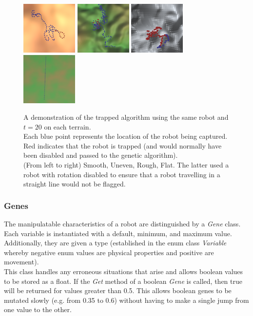 \documentclass{article}
\begin{document}
\begin{figure}[H]
\centering
\centerline{
\includegraphics[width=0.25\textwidth]{trappedSmooth}
\includegraphics[width=0.25\textwidth]{trappedUneven}
\includegraphics[width=0.25\textwidth]{trappedRough}
\includegraphics[width=0.25\textwidth]{trappedFlat}
}
\caption{A demonstration of the trapped algorithm using the same robot and $t=20$ on each terrain.\\
Each blue point represents the location of the robot being captured. Red indicates that the robot is trapped (and would normally have been disabled and passed to the genetic algorithm).\\ 
(From left to right) Smooth, Uneven, Rough, Flat. The latter used a robot with rotation disabled to ensure that a robot travelling in a straight line would not be flagged.}
\label{fig:trappedPoints}
\end{figure}


\subsubsection{Genes}
\label{sec:Genes Imp}
The manipulatable characteristics of a robot are distinguished by a \textit{Gene} class. Each variable is instantiated with a default, minimum, and maximum value. Additionally, they are given a type (established in the enum class \textit{Variable} whereby negative enum values are physical properties and positive are movement). \\
This class handles any erroneous situations that arise and allows boolean values to be stored as a float. If the \textit{Get} method of a boolean \textit{Gene} is called, then true will be returned for values greater than 0.5. This allows boolean genes to be mutated slowly (e.g. from 0.35 to 0.6) without having to make a single jump from one value to the other. \\
\end{document}
